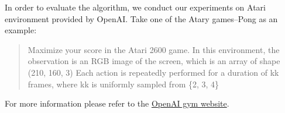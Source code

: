 
In order to evaluate the algorithm, we conduct our experiments on Atari environment
provided by OpenAI. Take one of the Atary games--Pong as an example:
\begin{quote}
Maximize your score in the Atari 2600 game. In this
environment, the observation is an RGB image of the screen, which is an array
of shape (210, 160, 3) Each action is repeatedly performed for a duration of
kk frames, where kk is uniformly sampled from \{2, 3, 4\}~\cite{brockman2016openai}
\end{quote}
For more information please refer to the \href{https://gym.openai.com/}{OpenAI gym website}.

